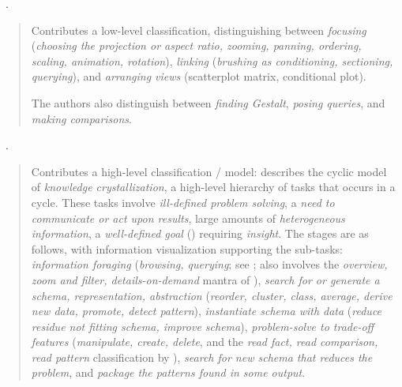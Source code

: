 \begin{sloppypar}
~\cite{Buja1996}. \end{sloppypar}

\begin{quotation}
    Contributes a low-level classification, distinguishing between {\it focusing} ({\it choosing the projection or aspect ratio, zooming, panning, ordering, scaling, animation, rotation}), {\it linking} ({\it brushing as conditioning, sectioning, querying}), and {\it arranging views} (\eg scatterplot matrix, conditional plot). 
    
    The authors also distinguish between {\it finding Gestalt}, {\it posing queries}, and {\it making comparisons}.
\end{quotation}

\begin{sloppypar}
~\cite{Card1999}. \end{sloppypar}

\begin{quotation}
    Contributes a high-level classification / model: describes the cyclic model of {\it knowledge crystallization}, a high-level hierarchy of tasks that occurs in a cycle.
    These tasks involve {\it ill-defined problem solving}, a {\it need to communicate or act upon results}, large amounts of {\it heterogeneous information}, a {\it well-defined goal} () requiring {\it insight}. 
    The stages are as follows, with information visualization supporting the sub-tasks:
    {\it information foraging} ({\it browsing, querying}; see \citet{Pirolli2005}; also involves the {\it overview, zoom and filter, details-on-demand} mantra of \citet{Shneiderman1996}), {\it search for or generate a schema, representation, abstraction} ({\it reorder, cluster, class, average, derive new data, promote, detect pattern}), {\it instantiate schema with data} ({\it reduce residue not fitting schema, improve schema}), {\it problem-solve to trade-off features} ({\it manipulate, create, delete}, and the {\it read fact, read comparison, read pattern} classification by \citet{Bertin2011}), {\it search for new schema that reduces the problem}, and {\it package the patterns found in some output}.
\end{quotation}

